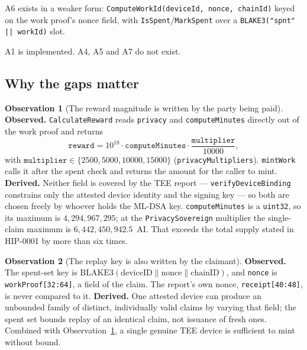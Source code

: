 \documentclass[11pt,a4paper]{article}
\theoremstyle{definition}
\newtheorem{observation}{Observation}[section]
\theoremstyle{remark}
\newcommand{\code}[1]{\texttt{#1}}
\begin{document}
A6 exists in a weaker form: \code{ComputeWorkId(deviceId, nonce, chainId)} keyed
on the work proof's nonce field, with \code{IsSpent}/\code{MarkSpent} over a
\code{BLAKE3("spnt" || workId)} slot.

A1 is implemented. A4, A5 and A7 do not exist.

\subsection{Why the gaps matter}

\begin{observation}[The reward magnitude is written by the party being paid]
\label{obs:magnitude}
\textbf{Observed.} \code{CalculateReward} reads \code{privacy} and
\code{computeMinutes} directly out of the work proof and returns
\[
\texttt{reward} = 10^{18} \cdot \texttt{computeMinutes} \cdot
\frac{\texttt{multiplier}}{10000},
\]
with $\texttt{multiplier} \in \{2500, 5000, 10000, 15000\}$
(\code{privacyMultipliers}). \code{mintWork} calls it after the spent check and
returns the amount for the caller to mint. \textbf{Derived.} Neither field is
covered by the TEE report --- \code{verifyDeviceBinding} constrains only the
attested device identity and the signing key --- so both are chosen freely by
whoever holds the ML-DSA key. \code{computeMinutes} is a \code{uint32}, so its
maximum is $4{,}294{,}967{,}295$; at the \code{PrivacySovereign} multiplier the
single-claim maximum is $6{,}442{,}450{,}942.5$~AI. That exceeds the total
supply stated in HIP-0001 by more than six times.
\end{observation}

\begin{observation}[The replay key is also written by the claimant]
\label{obs:replay}
\textbf{Observed.} The spent-set key is
$\mathrm{BLAKE3}(\text{deviceID} \| \text{nonce} \| \text{chainID})$, and
\code{nonce} is \code{workProof[32:64]}, a field of the claim. The report's own
nonce, \code{receipt[40:48]}, is never compared to it. \textbf{Derived.} One
attested device can produce an unbounded family of distinct, individually valid
claims by varying that field; the spent set bounds replay of an identical claim,
not issuance of fresh ones. Combined with
Observation~\ref{obs:magnitude}, a single genuine TEE device is sufficient to
mint without bound.
\end{observation}
\end{document}
